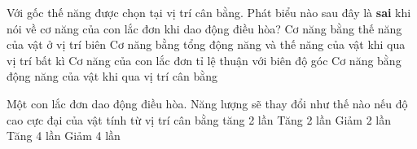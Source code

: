 
\begin{ex} %
Với gốc thế năng được chọn tại vị trí cân bằng. Phát biểu nào sau đây là \textbf{sai} khi nói về cơ năng của con lắc đơn khi dao động điều hòa?
\choice
{Cơ năng bằng thế năng của vật ở vị trí biên}
{Cơ năng bằng tổng động năng và thế năng của vật khi qua vị trí bất kì}
{\True Cơ năng của con lắc đơn tỉ lệ thuận với biên độ góc}
{Cơ năng bằng động năng của vật khi qua vị trí cân bằng}
\end{ex} 
\begin{ex} %

Một con lắc đơn dao động điều hòa. Năng lượng sẽ thay đổi như thế nào nếu độ cao cực đại của vật tính từ vị trí cân bằng tăng 2 lần
\choice
{\True Tăng 2 lần}
{Giảm 2 lần}
{Tăng 4 lần}
{Giảm 4 lần}
\end{ex} 


